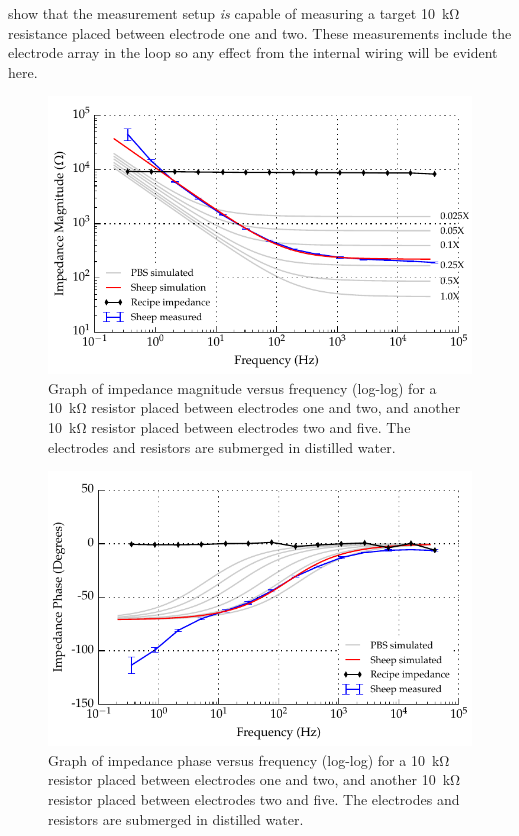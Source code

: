  show that the measurement setup \emph{is} capable of measuring a target \SI{10}{\kilo\ohm} resistance placed between electrode one and two.
These measurements include the electrode array in the loop so any effect from the internal wiring will be evident here.


\begin{figure}
    \centering
    \includegraphics[width=\textwidth]{content/appendices/Solution-Impedance-Measurements/graphics/run14_calibration_10k_water_ZVsF_graph_mag}
    \caption{\label{fig:calibration_10kRes_water_mag}Graph of impedance magnitude versus frequency (log-log) for a \SI{10}{\kilo\ohm} resistor placed between electrodes one and two, and another \SI{10}{\kilo\ohm} resistor placed between electrodes two and five. The electrodes and resistors are submerged in distilled water.}
\end{figure}

\begin{figure}
    \centering
    \includegraphics[width=\textwidth]{content/appendices/Solution-Impedance-Measurements/graphics/run14_calibration_10k_water_ZVsF_graph_phase}
    \caption{\label{fig:calibration_10kRes_water_phase}Graph of impedance phase versus frequency (log-log) for a \SI{10}{\kilo\ohm} resistor placed between electrodes one and two, and another \SI{10}{\kilo\ohm} resistor placed between electrodes two and five. The electrodes and resistors are submerged in distilled water.}
\end{figure}

